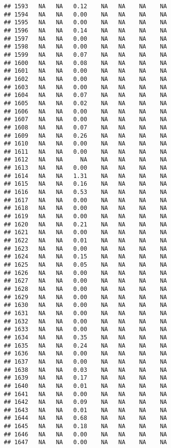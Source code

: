 \documentclass{article}\usepackage{graphicx, color}
\makeatletter
\newenvironment{kframe}{%
 \def\at@end@of@kframe{}%
 \ifinner\ifhmode%
  \def\at@end@of@kframe{\end{minipage}}%
  \begin{minipage}{\columnwidth}%
 \fi\fi%
 \def\FrameCommand##1{\hskip\@totalleftmargin \hskip-\fboxsep
 \colorbox{shadecolor}{##1}\hskip-\fboxsep
     \hskip-\linewidth \hskip-\@totalleftmargin \hskip\columnwidth}%
 \MakeFramed {\advance\hsize-\width
   \@totalleftmargin\z@ \linewidth\hsize
   \@setminipage}}%
 {\par\unskip\endMakeFramed%
 \at@end@of@kframe}
\newenvironment{knitrout}{}{} %
\makeatother
\begin{document}
\begin{knitrout}
\begin{kframe}
\begin{verbatim}
## 1593   NA   NA   0.12    NA   NA    NA    NA
## 1594   NA   NA   0.00    NA   NA    NA    NA
## 1595   NA   NA   0.00    NA   NA    NA    NA
## 1596   NA   NA   0.14    NA   NA    NA    NA
## 1597   NA   NA   0.00    NA   NA    NA    NA
## 1598   NA   NA   0.00    NA   NA    NA    NA
## 1599   NA   NA   0.07    NA   NA    NA    NA
## 1600   NA   NA   0.08    NA   NA    NA    NA
## 1601   NA   NA   0.00    NA   NA    NA    NA
## 1602   NA   NA   0.00    NA   NA    NA    NA
## 1603   NA   NA   0.00    NA   NA    NA    NA
## 1604   NA   NA   0.07    NA   NA    NA    NA
## 1605   NA   NA   0.02    NA   NA    NA    NA
## 1606   NA   NA   0.00    NA   NA    NA    NA
## 1607   NA   NA   0.00    NA   NA    NA    NA
## 1608   NA   NA   0.07    NA   NA    NA    NA
## 1609   NA   NA   0.26    NA   NA    NA    NA
## 1610   NA   NA   0.00    NA   NA    NA    NA
## 1611   NA   NA   0.00    NA   NA    NA    NA
## 1612   NA   NA     NA    NA   NA    NA    NA
## 1613   NA   NA   0.00    NA   NA    NA    NA
## 1614   NA   NA   1.31    NA   NA    NA    NA
## 1615   NA   NA   0.16    NA   NA    NA    NA
## 1616   NA   NA   0.53    NA   NA    NA    NA
## 1617   NA   NA   0.00    NA   NA    NA    NA
## 1618   NA   NA   0.00    NA   NA    NA    NA
## 1619   NA   NA   0.00    NA   NA    NA    NA
## 1620   NA   NA   0.21    NA   NA    NA    NA
## 1621   NA   NA   0.00    NA   NA    NA    NA
## 1622   NA   NA   0.01    NA   NA    NA    NA
## 1623   NA   NA   0.00    NA   NA    NA    NA
## 1624   NA   NA   0.15    NA   NA    NA    NA
## 1625   NA   NA   0.05    NA   NA    NA    NA
## 1626   NA   NA   0.00    NA   NA    NA    NA
## 1627   NA   NA   0.00    NA   NA    NA    NA
## 1628   NA   NA   0.00    NA   NA    NA    NA
## 1629   NA   NA   0.00    NA   NA    NA    NA
## 1630   NA   NA   0.00    NA   NA    NA    NA
## 1631   NA   NA   0.00    NA   NA    NA    NA
## 1632   NA   NA   0.00    NA   NA    NA    NA
## 1633   NA   NA   0.00    NA   NA    NA    NA
## 1634   NA   NA   0.35    NA   NA    NA    NA
## 1635   NA   NA   0.24    NA   NA    NA    NA
## 1636   NA   NA   0.00    NA   NA    NA    NA
## 1637   NA   NA   0.00    NA   NA    NA    NA
## 1638   NA   NA   0.03    NA   NA    NA    NA
## 1639   NA   NA   0.17    NA   NA    NA    NA
## 1640   NA   NA   0.01    NA   NA    NA    NA
## 1641   NA   NA   0.00    NA   NA    NA    NA
## 1642   NA   NA   0.09    NA   NA    NA    NA
## 1643   NA   NA   0.01    NA   NA    NA    NA
## 1644   NA   NA   0.68    NA   NA    NA    NA
## 1645   NA   NA   0.18    NA   NA    NA    NA
## 1646   NA   NA   0.00    NA   NA    NA    NA
## 1647   NA   NA   0.00    NA   NA    NA    NA

\end{verbatim}
\end{kframe}
\end{knitrout}
\end{document}
